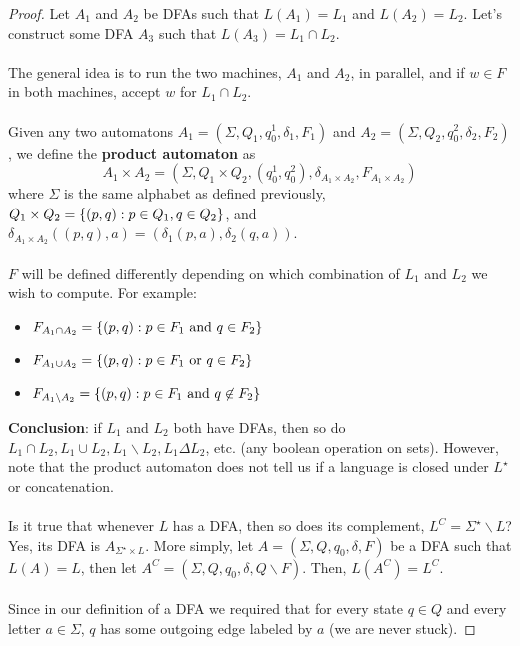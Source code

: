 \documentclass[]{article}
\DeclarePairedDelimiter{\set}{\lbrace}{\rbrace}
\theoremstyle{definition}
\begin{document}
        \begin{proof}
          Let $A_1$ and $A_2$ be DFAs such that $L(A_1) = L_1$ and $L(A_2) = L_2$. Let's construct some DFA $A_3$ such that $L(A_3) = L_1 \cap L_2$.
          \\ \\
          The general idea is to run the two machines, $A_1$ and $A_2$, in parallel, and if $w \in F$ in both machines, accept $w$ for $L_1 \cap L_2$.
          \\ \\
          Given any two automatons $A_1 = (\Sigma, Q_1, q_0^1, \delta_1, F_1)$ and $A_2 = (\Sigma, Q_2, q_0^2, \delta_2, F_2)$, we define the \textbf{product automaton} as
          $$
            A_1 \times A_2 = (\Sigma, Q_1 \times Q_2, (q_0^1, q_0^2), \delta_{A_1 \times A_2}, F_{A_1 \times A_2})
          $$
          where $\Sigma$ is the same alphabet as defined previously, $Q_1 \times Q_2 = \set{ (p, q) : p \in Q_1, q \in Q_2 }$, and $\delta_{A_1 \times A_2}((p, q), a) = (\delta_1(p, a), \delta_2(q, a))$.
          \\ \\
          $F$ will be defined differently depending on which combination of $L_1$ and $L_2$ we wish to compute. For example:
          \begin{itemize}
            \item $F_{A_1 \cap A_2} = \set{ (p, q) : p \in F_1 \text{ and } q \in F_2 }$
            \item $F_{A_1 \cup A_2} = \set{ (p, q) : p \in F_1 \text{ or } q \in F_2 }$
            \item $F_{A_1 \backslash A_2} = \set{ (p, q) : p \in F_1 \text{ and } q \not \in F_2 }$
          \end{itemize}

          \textbf{Conclusion}: if $L_1$ and $L_2$ both have DFAs, then so do $L_1 \cap L_2, L_1 \cup L_2, L_1 \backslash L_2, L_1 \Delta L_2$, etc. (any boolean operation on sets). However, note that the product automaton does not tell us if a language is closed under $L^\star$ or concatenation.
          \\ \\
          Is it true that whenever $L$ has a DFA, then so does its complement, $L^C = \Sigma^\star \backslash L$? Yes, its DFA is $A_{\Sigma^\star \times L}$. More simply, let $A = (\Sigma, Q, q_0, \delta, F)$ be a DFA such that $L(A) = L$, then let $A^C = (\Sigma, Q, q_0, \delta, Q \backslash F)$. Then, $L(A^C) = L^C$.
          \\ \\
          Since in our definition of a DFA we required that for every state $q \in Q$ and every letter $a \in \Sigma$, $q$ has some outgoing edge labeled by $a$ (we are never stuck).
        \end{proof}
\end{document}
